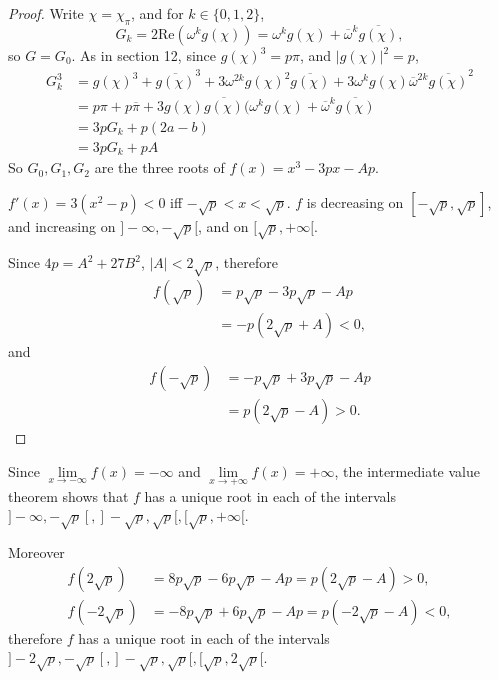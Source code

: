 \documentclass[11pt,a4paper]{article}
\begin{document}
\begin{proof}
Write $\chi = \chi_\pi$, and for $k \in \{0,1,2\}$, 
$$G_k = 2 \mathrm{Re}(\omega^k g(\chi)) = \omega^k g(\chi) + \overline{\omega}^k \overline{g(\chi)},$$
so $G = G_0$.
As in section 12, since $g(\chi)^3 = p \pi$, and $|g(\chi)|^2 = p$,
\begin{align*}
G_k^3 &= g(\chi)^3 + \overline{g(\chi)}^3 + 3 \omega^{2k} g(\chi)^2 \overline{g(\chi)} + 3 \omega^k g(\chi) \overline{\omega}^{2k} \overline{g(\chi)}^2\\
&= p \pi + p \overline{\pi} + 3 g(\chi) \overline{g(\chi)} (\omega^k g(\chi) + \overline{\omega}^k \overline{g(\chi)}\\
&= 3 p G_k + p(2a -b)\\
&= 3p G_k + pA
\end{align*}
So $G_0, G_1,G_2$ are the three roots of $f(x) = x^3 - 3p x - Ap$.

$f'(x) = 3(x^2-p)<0$ iff $-\sqrt{p} < x < \sqrt{p}$. $f$ is decreasing on $[-\sqrt{p},\sqrt{p}]$, and increasing on $]-\infty, -\sqrt{p}[$, and on $[\sqrt{p}, + \infty[$.

Since $4 p = A^2 + 27 B^2$, $|A| < 2 \sqrt{p}$, therefore
\begin{align*}
f(\sqrt{p}) &= p \sqrt{p} - 3 p \sqrt{p} - Ap\\
&=-p(2\sqrt{p} + A)<0,
\end{align*}
and
\begin{align*}
f(-\sqrt{p}) &= - p \sqrt{p} + 3 p \sqrt{p} - Ap\\
&= p(2\sqrt{p} - A)>0.
\end{align*}
\end{proof}

Since $\lim\limits_{x \to - \infty} f(x)= -\infty$ and $\lim\limits_{x \to  +\infty} f(x)= +\infty$, the intermediate value theorem shows that $f$ has a unique root in each of the intervals $]-\infty, -\sqrt{p}[,]-\sqrt{p},\sqrt{p}[, [\sqrt{p}, + \infty[$.

Moreover
\begin{align*}
f(2\sqrt{p}) &= 8p\sqrt{p} - 6p\sqrt{p} - Ap = p(2\sqrt{p} - A) >0,\\
f(-2\sqrt{p}) &= -8p\sqrt{p} + 6 p \sqrt{p} - Ap = p(-2\sqrt{p} - A) <0,
\end{align*}
therefore $f$ has a unique root in each of the intervals  $]-2 \sqrt{p}, -\sqrt{p}[,]-\sqrt{p},\sqrt{p}[, [\sqrt{p}, 2 \sqrt{p}[$.
\end{document}
